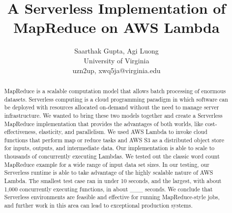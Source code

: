 \documentclass[letterpaper,twocolumn,10pt]{article}
\begin{document}

\date{}

\title{\Large \bf A Serverless Implementation of MapReduce on AWS Lambda}

\author{
	Saarthak Gupta, Agi Luong\\
	{University of Virginia}\\
	{uzn2up, xwq5ja}@virginia.edu
} 

\maketitle

\begin{abstract}
MapReduce is a scalable computation model that allows batch processing of enormous datasets. Serverless computing is a cloud programming paradigm in which software can be deployed with resources allocated on-demand without the need to manage server infrastructure. We wanted to bring these two models together and create a Serverless MapReduce implementation that provides the advantages of both worlds, like cost-effectiveness, elasticity, and parallelism. We used AWS Lambda to invoke cloud functions that perform map or reduce tasks and AWS S3 as a distributed object store for inputs, outputs, and intermediate data. Our implementation is able to scale to thousands of concurrently executing Lambdas. We tested out the classic word count MapReduce example for a wide range of input data set sizes. In our testing, our Serverless runtime is able to take advantage of the highly scalable nature of AWS Lambda. The smallest test case ran in under 10 seconds, and the largest, with about 1,000 concurrently executing functions, in about \_\_\_ seconds. We conclude that Serverless environments are feasible and effective for running MapReduce-style jobs, and further work in this area can lead to exceptional production systems.
\end{abstract}





\end{document}
